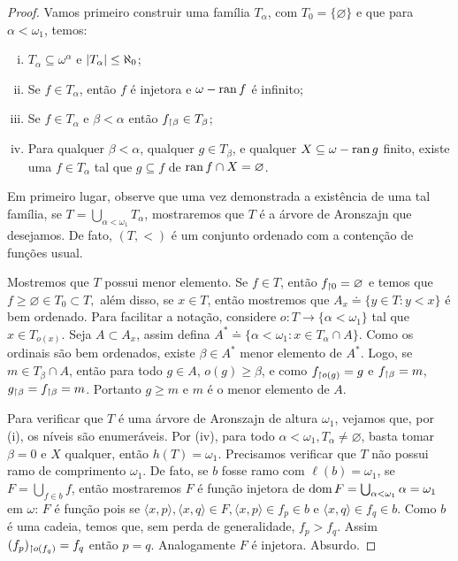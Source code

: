 \documentclass[a4paper]{article}
\begin{document}
\begin{proof}
  Vamos primeiro construir uma família \(T_\alpha\), com \(T_0=\{\varnothing\}\) e que para \(\alpha
  <\omega_1\), temos:
  \begin{enumerate}[(i)]
    \item \(T_{\alpha} \subseteq \omega^{\alpha}\) e \(\vert T_{\alpha} \vert \le \aleph_0\);
    \item Se \(f \in T_{\alpha}\), então \(f\) é injetora e \(\omega - \operatorname{ran} f\) é infinito;
    \item Se \(f \in T_{\alpha}\) e \(\beta < \alpha\) então \(f_{\upharpoonright \beta} \in T_{\beta}\);
    \item Para qualquer \(\beta < \alpha\), qualquer \(g \in T_{\beta}\), e
    qualquer \(X \subseteq \omega - \operatorname{ran} g\) finito, existe uma \(f \in
    T_{\alpha}\) tal que \(g \subseteq f\) de \(\operatorname{ran} f \cap X = \varnothing\).
    \end{enumerate}

    Em primeiro lugar, observe que uma vez demonstrada a existência de uma tal família,
    se \(T=\bigcup_{\alpha<\omega_1} T_\alpha\), mostraremos que \(T\) é a árvore de Aronszajn que desejamos. De fato, \((T,<)\) é um conjunto ordenado com a contenção de funções usual.
    
    Mostremos que \(T\) possui menor elemento. Se \(f\in T\), então \(f_{\upharpoonright 0}=\varnothing\) e temos que \(f\geq\varnothing\in T_0\subset T,\) além disso, se \(x\in T\), então mostremos que \(A_x\doteq\{y\in T : y<x\}\) é bem ordenado. Para facilitar a notação, considere \(o\colon T\rightarrow \{\alpha<\omega_1\}\) tal que \(x\in T_{o(x)}\). Seja \(A\subset A_x\), assim defina \(A^*\doteq \{\alpha<\omega_1 : x\in T_\alpha\cap A\}\). Como os ordinais são bem ordenados, existe \(\beta\in A^*\) menor elemento de \(A^*\).
    Logo, se \(m\in T_\beta\cap A\), então para todo \(g\in A\), \(o(g)\geq\beta\), e como \(f_{\upharpoonright o(g)}=g\) e \(f_{\upharpoonright \beta}=m\), \(g_{\upharpoonright \beta}=f_{\upharpoonright \beta}=m\). Portanto \(g\geq m\) e \(m\) é o menor elemento de \(A\).
    
    Para verificar que \(T\) é uma árvore de Aronszajn de altura \(\omega_1\), vejamos que, por (i), os níveis são enumeráveis. Por (iv), para todo \(\alpha<\omega_1, T_\alpha\neq\varnothing\), basta tomar \(\beta=0\) e \(X\) qualquer, então \(h(T)=\omega_1\). Precisamos verificar que \(T\) não possui ramo de comprimento \(\omega_1\). De fato, se \(b\) fosse ramo com \(\ell(b)=\omega_1\), se \(F=\bigcup_{f\in b} f\), então mostraremos \(F\) é função injetora de \(\operatorname{dom} F=\bigcup_{\alpha<\omega_1}\alpha=\omega_1\) em \(\omega\): \(F\) é função pois se \(\langle x,p\rangle,\langle x,q\rangle\in F,  \langle x,p\rangle\in f_p\in b\) e \(\langle x,q\rangle\in f_q\in b\). Como \(b\) é uma cadeia, temos que, sem perda de generalidade, \(f_p>f_q\). Assim \((f_p)_{\upharpoonright o(f_q)}=f_q\) então \(p=q\). Analogamente \(F\) é injetora. Absurdo.
    

\end{proof}
\end{document}
